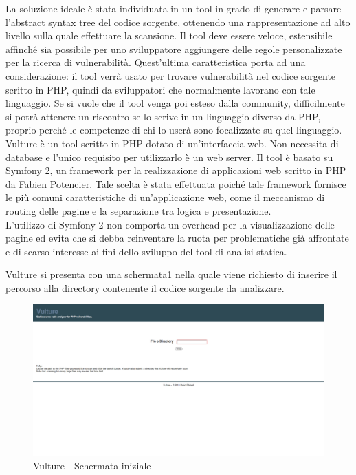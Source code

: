 La soluzione ideale è stata individuata in un tool in grado di generare e parsare l'abstract syntax tree del codice sorgente, ottenendo una rappresentazione ad alto livello sulla quale effettuare la scansione. Il tool deve essere veloce, estensibile affinché sia possibile per uno sviluppatore aggiungere delle regole personalizzate per la ricerca di vulnerabilità. Quest'ultima caratteristica porta ad una considerazione: il tool verrà usato per trovare vulnerabilità nel codice sorgente scritto in PHP, quindi da sviluppatori che normalmente lavorano con tale linguaggio. Se si vuole che il tool venga poi esteso dalla community, difficilmente si potrà attenere un riscontro se lo scrive in un linguaggio diverso da PHP, proprio perché le competenze di chi lo userà sono focalizzate su quel linguaggio.\\

Vulture è un tool scritto in PHP dotato di un'interfaccia web. Non necessita di database e l'unico requisito per utilizzarlo è un web server. Il tool è basato su Symfony 2\cite{symfony}, un framework per la realizzazione di applicazioni web scritto in PHP da Fabien Potencier. Tale scelta è stata effettuata poiché tale framework fornisce le più comuni caratteristiche di un'applicazione web, come il meccanismo di routing delle pagine e la separazione tra logica e presentazione.\\
L'utilizzo di Symfony 2 non comporta un overhead per la visualizzazione delle pagine ed evita che si debba reinventare la ruota per problematiche già affrontate e di scarso interesse ai fini dello sviluppo del tool di analisi statica.

Vulture si presenta con una schermata\ref{vultureinizio} nella quale viene richiesto di inserire il percorso alla directory contenente il codice sorgente da analizzare. 

\begin{figure}[!h]
\centering
\includegraphics[width=16cm]{Vulture.png}
\caption{Vulture - Schermata iniziale}\label{vultureinizio}
\end{figure}

